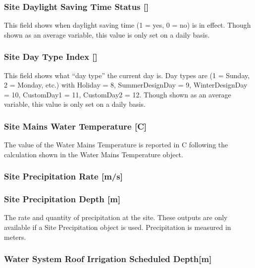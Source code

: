 \subsubsection{Site Daylight Saving Time Status {[]}}\label{site-daylight-saving-time-status}

This field shows when daylight saving time (1 = yes, 0 = no) is in effect. Though shown as an average variable, this value is only set on a daily basis.

\subsubsection{Site Day Type Index {[]}}\label{site-day-type-index}

This field shows what ``day type'' the current day is. Day types are (1 = Sunday, 2 = Monday, etc.) with Holiday = 8, SummerDesignDay = 9, WinterDesignDay = 10, CustomDay1 = 11, CustomDay2 = 12. Though shown as an average variable, this value is only set on a daily basis.

\subsubsection{Site Mains Water Temperature {[}C{]}}\label{site-mains-water-temperature-c}

The value of the Water Mains Temperature is reported in C following the calculation shown in the Water Mains Temperature object.

\subsubsection{Site Precipitation Rate {[}m/s{]}}\label{site-precipitation-rate-ms}

\subsubsection{Site Precipitation Depth {[}m{]}}\label{site-precipitation-depth-m-1}

The rate and quantity of precipitation at the site. These outputs are only available if a Site Precipitation object is used. Precipitation is measured in meters.

\subsubsection{Water System Roof Irrigation Scheduled Depth{[}m{]}}\label{water-system-roof-irrigation-scheduled-depthm}

